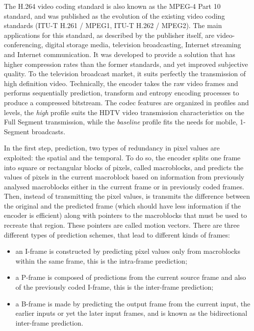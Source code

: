 \documentclass[
	12pt,				%
	openright,			%
	twoside,			%
	a4paper,			%
	brazil,
	french,				%
	english
	]{abntex2}
\begin{document}
The H.264 video coding standard is also known as the MPEG-4 Part 10 standard, and was published as the evolution of the existing video coding standards (ITU-T H.261 / MPEG1, ITU-T H.262 / MPEG2). The main applications for this standard, as described by the publisher itself, are video-conferencing, digital storage media, television broadcasting, Internet streaming and Internet communication. It was developed to provide a solution that has higher compression rates than the former standards, and yet improved subjective quality. To the television broadcast market, it suits perfectly the transmission of high definition video. Technically, the encoder takes the raw video frames and performs sequentially prediction, transform and entropy encoding processes to produce a compressed bitstream. The codec features are organized in profiles and levels, the \textit{high} profile suits the HDTV video transmission characteristics on the Full Segment transmission, while the \textit{baseline} profile fits the needs for mobile, 1-Segment broadcasts.


In the first step, prediction, two types of redundancy in pixel values are exploited: the spatial and the temporal. To do so, the encoder splits one frame into square or rectangular blocks of pixels, called macroblocks, and predicts the values of pixels in the current macroblock based on information from previously analysed macroblocks either in the current frame or in previously coded frames. Then, instead of transmitting the pixel values, is transmits the difference between the original and the predicted frame (which should have less information if the encoder is efficient) along with pointers to the macroblocks that must be used to recreate that region. These pointers are called motion vectors. There are three different types of prediction schemes, that lead to different kinds of frames:

\begin{itemize}
\item{an I-frame is constructed by predicting pixel values only from macroblocks within the same frame, this is the intra-frame prediction;}
\item{a P-frame is composed of predictions from the current source frame and also of the previously coded I-frame, this is the inter-frame prediction;}
\item{a B-frame is made by predicting the output frame from the current input, the earlier inputs or yet the later input frames, and is known as the bidirectional inter-frame prediction.}
\end{itemize}
\end{document}
